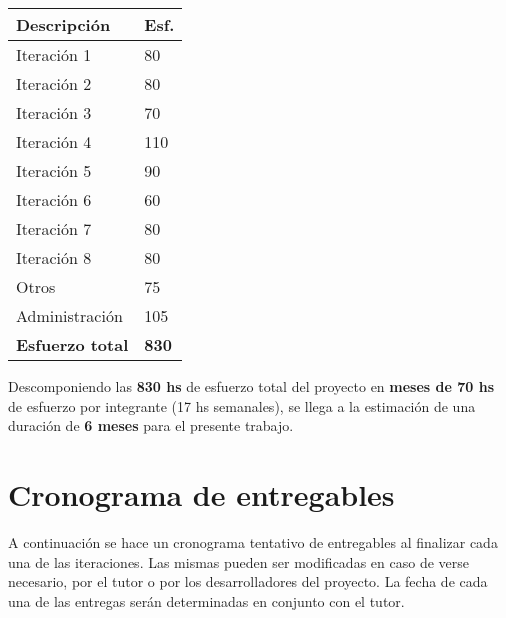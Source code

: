 \documentclass[
11pt, %
oneside, %
spanish, %
singlespacing, %
headsepline, %
chapterinoneline, %
]{MastersDoctoralThesis} %
\begin{document}
{
\setlength{\extrarowheight}{.2em}
\begin{center}
	\begin{tabular}{|l|l|}
    \hline
    \textbf{Descripción} & \textbf{Esf.}  \\ \hline
    Iteración 1 & 80 \\ \hline
    Iteración 2 & 80 \\ \hline
    Iteración 3 & 70 \\ \hline
    Iteración 4 & 110 \\ \hline
    Iteración 5 & 90 \\ \hline
    Iteración 6 & 60 \\ \hline
    Iteración 7 & 80 \\ \hline
    Iteración 8 & 80 \\ \hline
    Otros & 75 \\ \hline     
    Administración & 105 \\ \hline
    \textbf{Esfuerzo total} & \textbf{830} \\ \hline
    \end{tabular}
\end{center}
} 
\vspace{0.3cm}

Descomponiendo las \textbf{830 hs} de esfuerzo total del proyecto en \textbf{meses de 70 hs} de esfuerzo por integrante (17 hs semanales), se llega a la estimación de una duración de \textbf{6 meses} para el presente trabajo. 


\section{Cronograma de entregables}
A continuación se hace un cronograma tentativo de entregables al finalizar cada una de las iteraciones. Las mismas pueden ser modificadas en caso de verse necesario, por el tutor o por los desarrolladores del proyecto. La fecha de cada una de las entregas serán determinadas en conjunto con el tutor.
\end{document}
